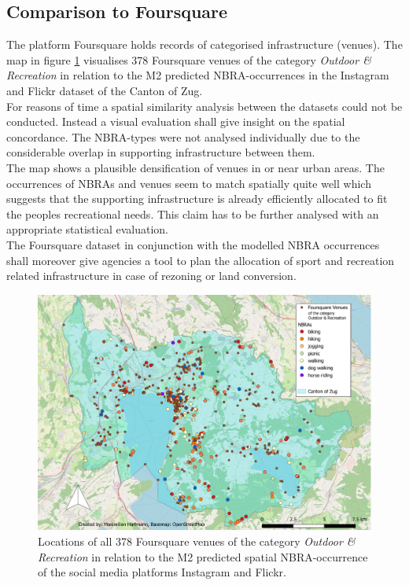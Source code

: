 \subsection{Comparison to Foursquare}
The platform Foursquare holds records of categorised infrastructure (venues). The map in figure \ref{fig:map_foursquare_comparison} visualises 378 Foursquare venues of the category \textit{Outdoor \& Recreation} in relation to the M2 predicted NBRA-occurrences in the Instagram and Flickr dataset of the Canton of Zug.\\
For reasons of time a spatial similarity analysis between the datasets could not be conducted. Instead a visual evaluation shall give insight on the spatial concordance. The NBRA-types were not analysed individually due to the considerable overlap in supporting infrastructure between them. \\
The map shows a plausible densification of venues in or near urban areas. The occurrences of NBRAs and venues seem to match spatially quite well which suggests that the supporting infrastructure is already efficiently allocated to fit the peoples recreational needs. This claim has to be further analysed with an appropriate statistical evaluation. \\
The Foursquare dataset in conjunction with the modelled NBRA occurrences shall moreover give agencies a tool to plan the allocation of sport and recreation related infrastructure in case of rezoning or land conversion.

\begin{figure}[h!]
   \centering
   \includegraphics[width=\textwidth,height=\textheight,keepaspectratio]{img/foursquare_comparison_cropped.pdf}
   \caption{Locations of all 378 Foursquare venues of the category \textit{Outdoor \& Recreation} in relation to the M2 predicted spatial NBRA-occurrence of the social media platforms Instagram and Flickr.}
   \label{fig:map_foursquare_comparison}
\end{figure}


